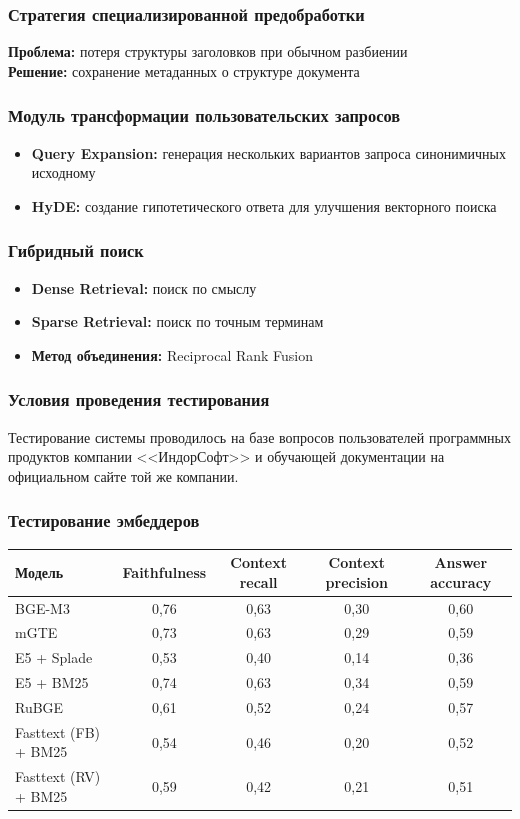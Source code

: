\documentclass[aspectratio=169, xcolor=table]{beamer} %
\begin{document}
\begin{frame}
\frametitle{Стратегия специализированной предобработки}
\textbf{Проблема:} потеря структуры заголовков при обычном разбиении \\[0.5cm]
\textbf{Решение:} сохранение метаданных о структуре документа
\end{frame}

\begin{frame}
\frametitle{Модуль трансформации пользовательских запросов}
\begin{itemize}
    \item \textbf{Query Expansion:} генерация нескольких вариантов запроса синонимичных исходному
    \item \textbf{HyDE:} создание гипотетического ответа для улучшения векторного поиска
\end{itemize}
\end{frame}

\begin{frame}
\frametitle{Гибридный поиск}
\begin{itemize}
    \item \textbf{Dense Retrieval:} поиск по смыслу
    \item \textbf{Sparse Retrieval:} поиск по точным терминам
    \item \textbf{Метод объединения:} Reciprocal Rank Fusion
\end{itemize}
\end{frame}

\begin{frame}
\frametitle{Условия проведения тестирования}
Тестирование системы проводилось на базе вопросов пользователей программных продуктов компании <<ИндорСофт>> и обучающей документации на официальном сайте той же компании.
\end{frame}

\begin{frame}
\frametitle{Тестирование эмбеддеров}
\centering
\renewcommand{\arraystretch}{1.3} %
\begin{tabular}{|l|c|c|c|c|}
    \hline
    \rowcolor{tabgreen} \textbf{Модель} & \textbf{Faithfulness} & \textbf{Context recall} & \textbf{Context precision} & \textbf{Answer accuracy} \\ \hline
    BGE-M3 & 0,76 & 0,63 & 0,30 & 0,60 \\ \hline
    mGTE & 0,73 & 0,63 & 0,29 & 0,59 \\ \hline
    E5 + Splade & 0,53 & 0,40 & 0,14 & 0,36 \\ \hline
    E5 + BM25 & 0,74 & 0,63 & 0,34 & 0,59 \\ \hline
    RuBGE & 0,61 & 0,52 & 0,24 & 0,57 \\ \hline
    Fasttext (FB) + BM25 & 0,54 & 0,46 & 0,20 & 0,52 \\ \hline
    Fasttext (RV) + BM25 & 0,59 & 0,42 & 0,21 & 0,51 \\ \hline
\end{tabular}
\end{frame}
\end{document}
